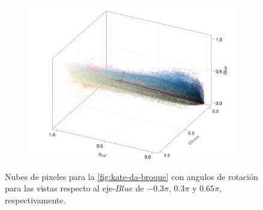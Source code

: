 \begin{figure}[ht!]
\begin{subfigure}[c]{0.3\textwidth}
        \centering
        \includegraphics[scale=0.09]{../pictures/pixel_cloud_kate_3}
    \end{subfigure}
    \caption{Nubes de pixeles para la \cref{fig:kate-da-broque} con angulos de rotación para las vistas respecto al eje-$Blue$ de $-0.3\pi$, $0.3\pi$ y $0.65\pi$, respectivamente.}
    \label{fig:nube-pixeles-kate}
\end{figure}

